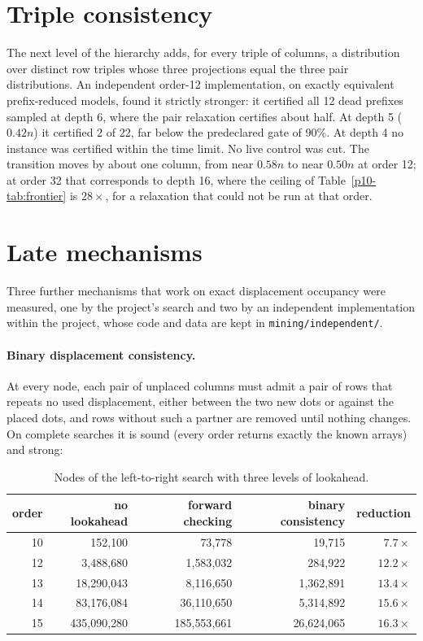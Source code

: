 \documentclass[11pt,a4paper,oneside]{report}
\theoremstyle{definition}
\begin{document}
\section{Triple consistency}
\label{p10-sec:triple}
The next level of the hierarchy adds, for every triple of columns, a distribution over distinct row triples
whose three projections equal the three pair distributions. An independent order-12 implementation, on
exactly equivalent prefix-reduced models, found it strictly stronger: it certified all 12 dead prefixes
sampled at depth 6, where the pair relaxation certifies about half. At depth 5 ($0.42n$) it certified 2 of 22,
far below the predeclared gate of 90\%. At depth 4 no instance was certified within the time limit. No live
control was cut. The transition moves by about one column, from near $0.58n$ to near $0.50n$ at order 12; at
order 32 that corresponds to depth 16, where the ceiling of Table~\ref{p10-tab:frontier} is $28\times$, for a
relaxation that could not be run at that order.

\section{Late mechanisms}
\label{p10-sec:late}
Three further mechanisms that work on exact displacement occupancy were measured, one by the project's
search and two by an independent implementation within the project, whose code and data are kept in
\texttt{mining/independent/}.

\paragraph{Binary displacement consistency.} At every node, each pair of unplaced columns must admit a pair
of rows that repeats no used displacement, either between the two new dots or against the placed dots,
and rows without such a partner are removed until nothing changes. On complete searches it is sound (every
order returns exactly the known arrays) and strong:

\begin{table}[H]
\centering
\small
\begin{tabular}{@{}rrrrr@{}}
\toprule
order & no lookahead & forward checking & binary consistency & reduction \\
\midrule
10 & 152{,}100 & 73{,}778 & 19{,}715 & $7.7\times$ \\
12 & 3{,}488{,}680 & 1{,}583{,}032 & 284{,}922 & $12.2\times$ \\
13 & 18{,}290{,}043 & 8{,}116{,}650 & 1{,}362{,}891 & $13.4\times$ \\
14 & 83{,}176{,}084 & 36{,}110{,}650 & 5{,}314{,}892 & $15.6\times$ \\
15 & 435{,}090{,}280 & 185{,}553{,}661 & 26{,}624{,}065 & $16.3\times$ \\
\bottomrule
\end{tabular}
\caption{Nodes of the left-to-right search with three levels of lookahead.}
\label{p10-tab:binac}
\end{table}
\end{document}
